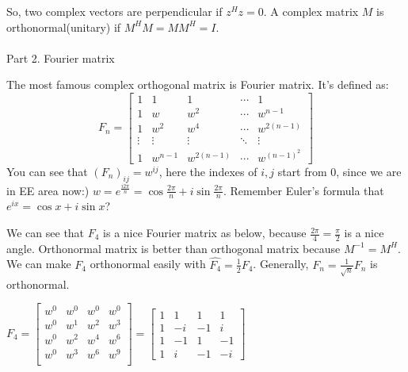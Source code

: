 \documentclass{article}
\begin{document}
\begin{spacing}{1.5}
So, two complex vectors are perpendicular  if $z^Hz=0$. A complex matrix $M$ is orthonormal(unitary) if $M^H M=MM^H=I$.
\\\\Part 2. Fourier matrix

The most famous complex orthogonal matrix is Fourier matrix. It's defined as:
$$
F_n =
\begin{bmatrix}
1 & 1 & 1 & \cdots & 1\\
1 & w & w^2 & \cdots & w^{n-1}\\
1 & w^2 & w^4 & \cdots & w^{2(n-1)}\\
\vdots &\vdots&  \vdots & \ddots &  \vdots \\
1 & w^{n-1} & w^{2(n-1)} & \cdots & w^{(n-1)^2}
\end{bmatrix}
$$
You can see that $(F_n)_{ij}=w^{ij}$, here the indexes of $i, j$ start from 0, since we are in EE area now:) $w=e^{\frac{i2\pi}{n}}=\cos \frac{2\pi}{n} + i\sin \frac{2\pi}{n}$. Remember Euler's formula that $e^{ix}=\cos x+i\sin x$? 

We can see that $F_4$ is a nice Fourier matrix as below, because $\frac{2\pi}{4}=\frac{\pi}{2}$ is a nice angle. Orthonormal matrix is better than orthogonal matrix because $M^{-1}=M^H$. We can make $F_4$ orthonormal easily with $\hat {F_4}=\frac{1}{2}F_4$. Generally, $\hat {F_n}=\frac{1}{\sqrt n}F_n$ is orthonormal.

\begin{center}
$ F_4={
	\begin{bmatrix}
	w ^{0}&w ^{0}&w ^{0}&w ^{0}
	\\w ^{0}&w ^{1}&w ^{2}&w ^{3}
	\\w ^{0}&w ^{2}&w ^{4}&w ^{6}
	\\w^{0}&w^{3}&w^{6}&w^{9}
	\\ \end
	{bmatrix}}
=
	{\begin{bmatrix}
	1&1&1&1\\
	1&-i&-1&i\\
	1&-1&1&-1\\
	1&i&-1&-i
	\end{bmatrix}}$
\end{center}


\end{spacing}
\end{document}
